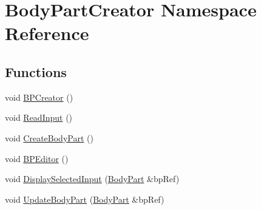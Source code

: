 \hypertarget{namespace_body_part_creator}{}\section{Body\+Part\+Creator Namespace Reference}
\label{namespace_body_part_creator}
\subsection*{Functions}
\begin{DoxyCompactItemize}
\item 
void \mbox{\hyperlink{namespace_body_part_creator_aa69c6643c5e96d7dee3884662bb6ca00}{B\+P\+Creator}} ()
\item 
void \mbox{\hyperlink{namespace_body_part_creator_a7d0a8af2804bcc6a41e19b1d84013efd}{Read\+Input}} ()
\item 
void \mbox{\hyperlink{namespace_body_part_creator_a1e5297a1d1c20d2867434868cfc42ac1}{Create\+Body\+Part}} ()
\item 
void \mbox{\hyperlink{namespace_body_part_creator_ac18c9ae3935b336efbb9634fb329413f}{B\+P\+Editor}} ()
\item 
void \mbox{\hyperlink{namespace_body_part_creator_af0715dc94164f78c721237555a28209c}{Display\+Selected\+Input}} (\mbox{\hyperlink{class_body_part}{Body\+Part}} \&bp\+Ref)
\item 
void \mbox{\hyperlink{namespace_body_part_creator_ab6d6a7845f43f745c09aaa1514881e20}{Update\+Body\+Part}} (\mbox{\hyperlink{class_body_part}{Body\+Part}} \&bp\+Ref)
\end{DoxyCompactItemize}
